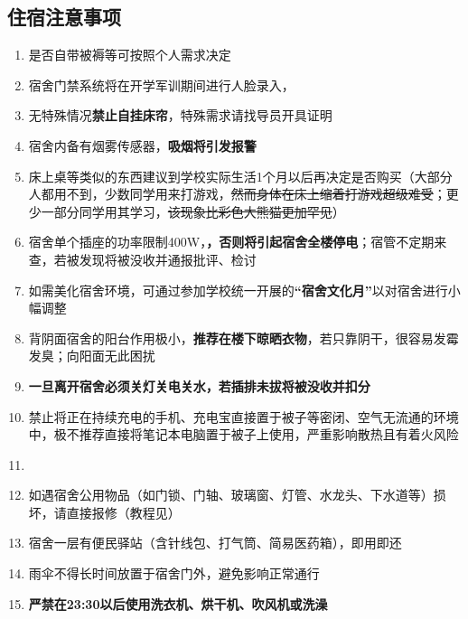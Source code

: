 \subsection[住宿注意事项]{住宿注意事项}
\begin{enumerate}
    \item 是否自带被褥等可按照个人需求决定\footnotemark
    \item 宿舍门禁系统将在开学军训期间进行人脸录入，\textbf{}
    \item 无特殊情况\textbf{禁止自挂床帘}，特殊需求请找导员开具证明
    \item 宿舍内备有烟雾传感器，\textbf{吸烟将引发报警\footnotemark}
    \item 床上桌等类似的东西建议到学校实际生活1个月以后再决定是否购买（大部分人都用不到，少数同学用来打游戏，\sout{然而身体在床上缩着打游戏超级难受}；更少一部分同学用其学习，\sout{该现象\linebreak[3]比彩色大熊猫更加罕见}）
    \item 宿舍单个插座的功率限制400W\footnotemark，\textbf{，否则将引起宿舍全楼停电}；宿管不定期来查，若被发现将被没收并通报批评、检讨
    \item 如需美化宿舍环境，可通过参加学校统一开展的\textbf{“宿舍文化月”}\footnotemark 以对宿舍进行小幅调整
    \item 背阴面宿舍的阳台作用极小，\textbf{推荐在楼下晾晒衣物}，若只靠阴干，很容易发霉发臭；向阳面无此困扰
    \item \textbf{一旦离开宿舍必须关灯关电关水，若插排未拔将被没收并扣分}
    \item 禁止将正在持续充电的手机、充电宝直接置于被子等密闭、空气无流通的环境中，极不推荐直接将笔记本电脑置于被子上使用，严重影响散热且有着火风险
    \item \textbf{}\footnotemark
    \item 如遇宿舍公用物品（如门锁、门轴、玻璃窗、灯管、水龙头、下水道等）损坏，请直接报修（教程见）
    \item 宿舍一层有便民驿站（含针线包、打气筒、简易医药箱），即用即还
    \item 雨伞不得长时间放置于宿舍门外，避免影响正常通行
    \item \textbf{严禁在23:30以后使用洗衣机、烘干机、吹风机或洗澡}
\end{enumerate}

